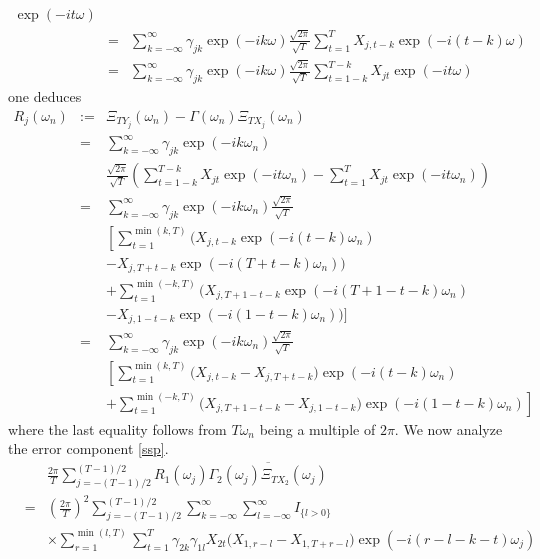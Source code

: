 \documentclass[a4paper]{book}
\begin{document}
\begin{appendix}
\begin{eqnarray}
\exp(-it
\omega)\nonumber\\
&=&\sum_{k=-\infty}^{\infty}\gamma_{jk}\exp(-ik\omega)\frac{\sqrt{2\pi}}{\sqrt{T}}
\sum_{t=1}^{T}
X_{j,t-k}\exp(-i(t-k)\omega)\nonumber\\
&=&\sum_{k=-\infty}^{\infty}\gamma_{jk}\exp(-ik\omega)\frac{\sqrt{2\pi}}{\sqrt{T}}
\sum_{t=1-k}^{T-k} X_{jt}\exp(-it\omega)\nonumber
\end{eqnarray}
one deduces
\begin{eqnarray}
R_{j}(\omega_n)&:=&\Xi_{TY_j}(\omega_n)-\Gamma(\omega_n)\Xi_{TX_j}(\omega_n)\nonumber\\
&=&\sum_{k=-\infty}^{\infty}\gamma_{jk}\exp(-ik\omega_n)\nonumber\\
&&\frac{\sqrt{2\pi}}{\sqrt{T}} \left(\sum_{t=1-k}^{T-k}
X_{jt}\exp(-it\omega_n)-\sum_{t=1}^{T}
X_{jt}\exp(-it\omega_n)\right)\nonumber\\
&=&\sum_{k=-\infty}^{\infty}\gamma_{jk}\exp(-ik\omega_n)\frac{\sqrt{2\pi}}{\sqrt{T}}\nonumber\\
&&\left[\sum_{t=1}^{\min(k,T)} \Big(X_{j,t-k}\exp(-i(t-k)\omega_n)\right.\nonumber\\
&&-X_{j,T+t-k}\exp(-i(T+t-k)\omega_n)\Big)\nonumber\\
&&+\sum_{t=1}^{\min(-k,T)}
\Big(X_{j,T+1-t-k}\exp(-i(T+1-t-k)\omega_n)\nonumber\\
&&-X_{j,1-t-k}\exp(-i(1-t-k)\omega_n)\Big)\Bigg]
\nonumber\\
&=&\sum_{k=-\infty}^{\infty}\gamma_{jk}\exp(-ik\omega_n)\frac{\sqrt{2\pi}}{\sqrt{T}}\nonumber\\
&&\left[\sum_{t=1}^{\min(k,T)} \Big(X_{j,t-k}-X_{j,T+t-k}\Big)\exp(-i(t-k)\omega_n)\right.\nonumber\\
&&+\left.\sum_{t=1}^{\min(-k,T)}
\Big(X_{j,T+1-t-k}-X_{j,1-t-k}\Big)\exp(-i(1-t-k)\omega_n)\right]\nonumber
\end{eqnarray}
where the last equality follows from $T\omega_n$ being a multiple of
$2\pi$. We now analyze the error component \ref{ssp}.
\begin{eqnarray*}
&&\frac{2\pi}{T}\sum_{j=-(T-1)/2}^{(T-1)/2}R_1(\omega_j)
\overline{\Gamma_2(\omega_j)\Xi_{TX_2}(\omega_j)}\\
&=&\left(\frac{2\pi}{T}\right)^2\sum_{j=-(T-1)/2}^{(T-1)/2}\sum_{k=-\infty}^\infty
\sum_{l=-\infty}^\infty
I_{\{l>0\}}\\
&&\times\sum_{r=1}^{\min(l,T)} \sum_{t=1}^{T}
\gamma_{2k}\gamma_{1l}X_{2t}
\Big(X_{1,r-l}-X_{1,T+r-l}\Big)\exp(-i(r-l-k-t)\omega_j)\\

\end{eqnarray*}
\end{appendix}
\end{document}
